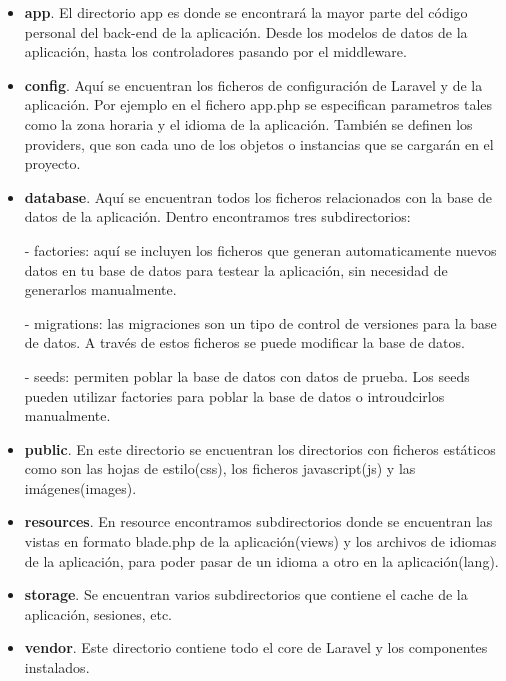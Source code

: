 \begin{itemize}

\item \textbf{app}. El directorio app es donde se encontrará la mayor parte del código personal del back-end de la aplicación. Desde los modelos de datos de la aplicación, hasta los controladores pasando por el middleware.

\item \textbf{config}. Aquí se encuentran los ficheros de configuración de Laravel y de la aplicación. Por ejemplo en el fichero app.php se especifican parametros tales como la zona horaria y el idioma de la aplicación. También se definen los providers, que son cada uno de los objetos o instancias que se cargarán en el proyecto. 

\item \textbf{database}. Aquí se encuentran todos los ficheros relacionados con la base de datos de la aplicación. Dentro encontramos tres subdirectorios:

- factories: aquí se incluyen los ficheros que generan automaticamente nuevos datos en tu base de datos para testear la aplicación, sin necesidad de generarlos manualmente.

- migrations: las migraciones son un tipo de control de versiones para la base de datos. A través de estos ficheros se puede modificar la base de datos.

- seeds: permiten poblar la base de datos con datos de prueba. Los seeds pueden utilizar factories para poblar la base de datos o introudcirlos manualmente.

\item \textbf{public}. En este directorio se encuentran los directorios con ficheros estáticos como son las hojas de estilo(css), los ficheros javascript(js) y las imágenes(images).

\item \textbf{resources}. En resource encontramos subdirectorios donde se encuentran las vistas  en formato blade.php de la aplicación(views) y los archivos de idiomas de la aplicación, para poder pasar de un idioma a otro en la aplicación(lang).

\item \textbf{storage}. Se encuentran varios subdirectorios que contiene el cache de la aplicación, sesiones, etc.

\item \textbf{vendor}. Este directorio contiene todo el core de Laravel y los componentes instalados.

\end{itemize}


